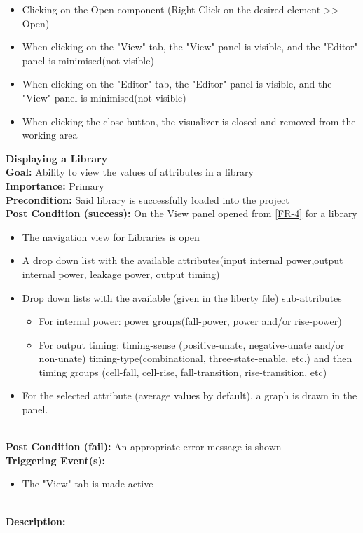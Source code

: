 \documentclass[10pt,a4paper]{report}
\newcommand{\precondition}[1]{
    \textbf{Precondition: } #1 \leavevmode \\
}
\newcommand{\FRDescription}[8]{
    \textbf{#1} \leavevmode \\
    \textbf{Goal: } #2 \leavevmode \\
    \textbf{Importance: } #3 \leavevmode \\
    \precondition{#4}
    \textbf{Post Condition (success): } #5 \leavevmode \\
    \textbf{Post Condition (fail): } #6 \leavevmode \\
    \textbf{Triggering Event(s): } #7 \leavevmode \\
    \textbf{Description: } \leavevmode \\ 
    #8}
\begin{document}
\begin{FR}
{\begin{itemize}
        \item Clicking on the Open component (Right-Click on the desired element >> Open)
    \end{itemize}}
    {\begin{itemize}
        \item When clicking on the "View" tab, the "View" panel is visible, and the "Editor" panel is minimised(not visible)
        \item When clicking on the "Editor" tab, the "Editor" panel is visible, and the "View" panel is minimised(not visible)
        \item When clicking the close button, the visualizer is closed and removed from the working area 
    \end{itemize}}
    \item \FRDescription{Displaying a Library}
    {Ability to view the values of attributes in a library}
    {Primary}
    {Said library is successfully loaded into the project}
    {On the View panel opened from \ref{FR-4} for a library
        \begin{itemize}
            \item The navigation view for Libraries is open
            \item A drop down list with the available attributes(input internal power,output internal power, leakage power, output timing)
            \item Drop down lists with the available (given in the liberty file) sub-attributes
            \begin{itemize}
                \item For internal power: power groups(fall-power, power and/or rise-power)
                \item For output timing: timing-sense (positive-unate, negative-unate and/or non-unate) timing-type(combinational, three-state-enable, etc.) and then timing groups (cell-fall, cell-rise, fall-transition, rise-transition, etc)
            \end{itemize}
            \item For the selected attribute (average values by default), a graph is drawn in the panel.
        \end{itemize}}
    {An appropriate error message is shown}
    {\begin{itemize}
        \item The "View" tab is made active
    \end{itemize}}
    {\begin{itemize}

\end{itemize}}
\end{FR}
\end{document}
